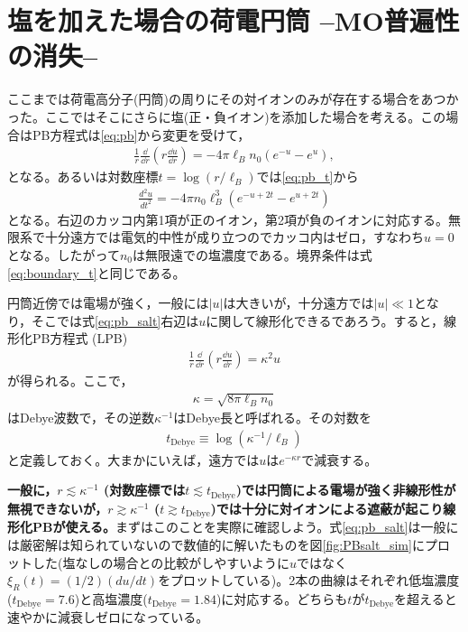 \documentclass[11pt,a4paper]{ltjsarticle}
\newcommand{\tD}{t_\mathrm{Debye}}
\theoremstyle{definition}
\theoremstyle{remark}
\begin{document}
\section{塩を加えた場合の荷電円筒 --MO普遍性の消失--}
ここまでは荷電高分子(円筒)の周りにその対イオンのみが存在する場合をあつかった。ここではそこにさらに塩(正・負イオン)を添加した場合を考える。この場合はPB方程式は\eqref{eq:pb}から変更を受けて，
\begin{align}
  \frac{1}{r}\frac{\dd}{\dd r}\left(r\frac{\dd u}{\dd r}\right)=-4\pi \ell_Bn_0 (e^{-u}-e^{u}), \label{eq:pb_salt}
\end{align}
となる。あるいは対数座標$t=\log(r/\ell_B)$では\eqref{eq:pb_t}から
\begin{align}
  \frac{d^2 u}{dt^2} = -4\pi n_0\ell_B^3 (e^{-u+2t}-e^{u+2t}) \label{eq:pb_salt_t}
\end{align}
となる。右辺のカッコ内第1項が正のイオン，第2項が負のイオンに対応する。無限系で十分遠方では電気的中性が成り立つのでカッコ内はゼロ，すなわち$u=0$となる。したがって$n_0$は無限遠での塩濃度である。境界条件は式\eqref{eq:boundary_t}と同じである。

円筒近傍では電場が強く，一般には$|u|$は大きいが，十分遠方では$|u|\ll 1$となり，そこでは式\eqref{eq:pb_salt}右辺は$u$に関して線形化できるであろう。すると，線形化PB方程式 (LPB)
\begin{align}
  \frac{1}{r}\frac{\dd}{\dd r}\left(r\frac{\dd u}{\dd r}\right)=\kappa^2 u \label{eq:lpb}
\end{align}
が得られる。ここで，
\begin{align}
  \kappa=\sqrt{8\pi\ell_B n_0}
\end{align}
はDebye波数で，その逆数$\kappa^{-1}$はDebye長と呼ばれる。その対数を
\begin{align}
  \tD\equiv \log(\kappa^{-1}/\ell_B)
\end{align}
と定義しておく。大まかにいえば，遠方では$u$は$e^{-\kappa r}$で減衰する。

\textbf{一般に，$r\lesssim \kappa^{-1}$ (対数座標では$t\lesssim \tD$)では円筒による電場が強く非線形性が無視できないが，$r\gtrsim \kappa^{-1}$ ($t\gtrsim \tD$)では十分に対イオンによる遮蔽が起こり線形化PBが使える。}まずはこのことを実際に確認しよう。式\eqref{eq:pb_salt}は一般には厳密解は知られていないので数値的に解いたものを図\ref{fig:PBsalt_sim}にプロットした(塩なしの場合との比較がしやすいように$u$ではなく$\xi_R(t)=(1/2)(du/dt)$をプロットしている)。2本の曲線はそれぞれ低塩濃度($\tD=7.6$)と高塩濃度($\tD=1.84$)に対応する。どちらも$t$が$\tD$を超えると速やかに減衰しゼロになっている。
\end{document}
